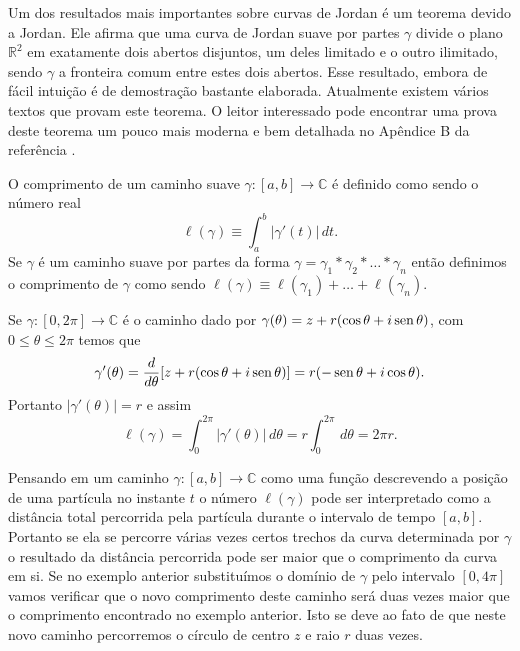 Um dos resultados mais importantes sobre curvas de Jordan é um teorema devido a Jordan.
Ele afirma que uma curva de Jordan suave por partes $\gamma$ divide o plano $\mathbb{R}^2$
em exatamente dois abertos disjuntos, um deles limitado e o outro ilimitado, sendo 
$\gamma$ a fronteira comum entre estes dois abertos. Esse resultado, embora de fácil 
intuição é de demostração bastante elaborada. Atualmente existem vários textos que provam
este teorema. O leitor interessado pode encontrar uma prova deste teorema um pouco 
mais moderna e bem detalhada no Apêndice B da referência \cite{MR1976398}.


\begin{definicao}
\label{def-comp-caminho}
O comprimento de um caminho suave $\gamma:[a,b]\to\mathbb{C}$ é definido como sendo o número real
\[
\ell(\gamma)\equiv 
\int_{a}^{b} |\gamma'(t)|\, dt.
\]
Se $\gamma$ é um caminho suave por partes da forma $\gamma=\gamma_1*\gamma_2*\ldots*\gamma_n$
então definimos o comprimento de $\gamma$ como sendo $\ell(\gamma)\equiv \ell(\gamma_1)+\ldots+\ell(\gamma_n)$.
\end{definicao}


\begin{exemplo}
Se $\gamma:[0,2\pi]\to\mathbb{C}$ é o caminho dado por $\gamma(\theta)=z+r(\cos\theta+i\operatorname{sen}\theta)$,
com $0\leqslant \theta\leqslant 2\pi$ temos que 
\[
\gamma'(\theta) = \frac{d}{d\theta}[z+r(\cos\theta+i\operatorname{sen}\theta)]=r(-\operatorname{sen}\theta+i\cos\theta).
\]
Portanto $|\gamma'(\theta)|=r$ e assim 
\[
\ell(\gamma) 
= 
\int_{0}^{2\pi} |\gamma'(\theta)|\, d\theta 
= 
r\int_{0}^{2\pi}\, d\theta 
=
2\pi r.
\]
\end{exemplo}

Pensando em um caminho $\gamma:[a,b]\to\mathbb{C}$ como uma função descrevendo a posição de uma partícula
no instante $t$ o número $\ell(\gamma)$ pode ser interpretado como a distância total percorrida pela 
partícula durante o intervalo de tempo $[a,b]$. Portanto se ela se percorre várias vezes certos
trechos da curva determinada por $\gamma$ o resultado da distância percorrida pode ser
maior que o comprimento da curva em si. Se no exemplo anterior substituímos o domínio de $\gamma$
pelo intervalo $[0,4\pi]$ vamos verificar que o novo comprimento deste caminho será duas vezes maior que
o comprimento encontrado no exemplo anterior. Isto se deve ao fato de que neste novo caminho percorremos
o círculo de centro $z$ e raio $r$ duas vezes.  


\bigskip 


